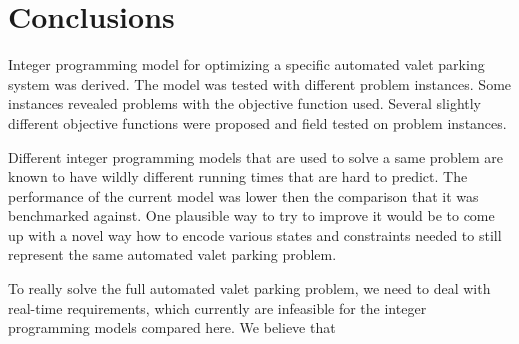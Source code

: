 \section{Conclusions}
Integer programming model for optimizing a specific automated valet parking
system was derived. The model was tested with different problem instances. Some
instances revealed problems with the objective function used. Several slightly
different objective functions were proposed and field tested on problem
instances.

Different integer programming models that are used to solve a same problem are
known to have wildly different running times that are hard to predict. The
performance of the current model was lower then the comparison that it was
benchmarked against. One plausible way to try to improve it would be to come up
with a novel way how to encode various states and constraints needed to still
represent the same automated valet parking problem.

To really solve the full automated valet parking problem, we need to deal with
real-time requirements, which currently are infeasible for the integer
programming models compared here. We believe that 
